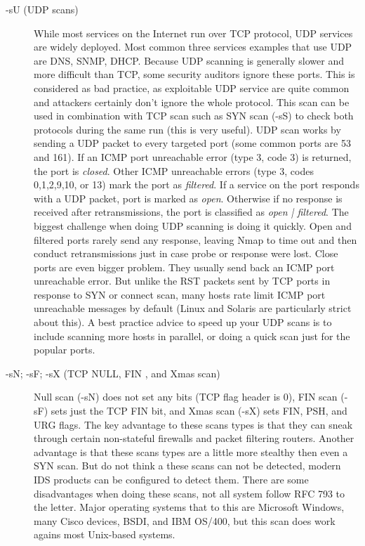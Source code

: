 \documentclass[times, utf8, seminar,english]{fer}
\begin{document}
\begin{description}
	\item [-sU (UDP scans)] While most services on the Internet run over TCP protocol, UDP services are widely deployed. Most common three services examples that use UDP are DNS, SNMP, DHCP. Because UDP scanning is generally slower and more difficult than TCP, some security auditors ignore these ports. This is considered as bad practice, as exploitable UDP service are quite common and attackers certainly don't ignore the whole protocol. This scan can be used in combination with TCP scan such as SYN scan (-sS) to check both protocols during the same run (this is very useful). UDP scan works by sending a UDP packet to every targeted port (some common ports are 53 and 161). If an ICMP port unreachable error (type 3, code 3) is returned, the port is \textit{closed}. Other ICMP unreachable errors (type 3, codes 0,1,2,9,10, or 13) mark the port as \textit{filtered}. If a service on the port responds with a UDP packet, port is marked as \textit{open}. Otherwise if no response is received after retransmissions, the port is classified as \textit{open | filtered}. The biggest challenge when doing UDP scanning is doing it quickly.  Open and filtered ports rarely send any response, leaving Nmap to time out and then conduct retransmissions just in case probe or response were lost. Close ports are even bigger problem. They usually send back an ICMP port unreachable error. But unlike the RST packets sent by TCP ports in response to SYN or connect scan, many hosts rate limit ICMP port unreachable messages by default (Linux and Solaris are particularly strict about this). A best practice advice to speed up your UDP scans is to include scanning more hosts in parallel, or doing a quick scan just for the popular ports.
	\item [-sN; -sF; -sX (TCP NULL, FIN , and Xmas scan)] Null scan (-sN) does not set any bits (TCP flag header is 0), FIN scan (-sF) sets just the TCP FIN bit, and Xmas scan (-sX) sets FIN, PSH, and URG flags. The key advantage to these scans types is that they can sneak through certain non-stateful firewalls and packet filtering routers. Another advantage is that these scans types are a little more stealthy then even a SYN scan. But do not  think a these scans can not be detected, modern IDS products can be configured to detect them. There are some disadvantages when doing these scans, not all system follow RFC 793 to the letter. Major operating systems that to this are Microsoft Windows, many Cisco devices, BSDI, and IBM OS/400, but this scan does work agains most Unix-based systems. 
\end{description}
\pagebreak
\end{document}
